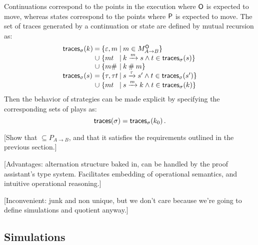 Continuations correspond to
the points in the execution where $ \mathsf{O} $ is expected to move,
whereas states correspond to
the points where $ \mathsf{P} $ is expected to move.
The set of traces generated by a continuation or state are
defined by mutual recursion as:
\[
  \begin{array}{l@{\:}c@{\:\{}l@{\:\mid\:}l}
    \kw{traces}_\sigma(k) & = & \varepsilon, m &
      m \in M_{A \rightarrow B}^\kw{O} \} \\
    & \cup & m t &
      k \xrightarrow{m} s \wedge t \in \kw{traces}_\sigma(s) \} \\
    & \cup & m \# &
      k \: \# \: m \} \\
    \kw{traces}_\sigma(s) & = & \tau, \tau t &
      s \xrightarrow{\tau} s' \wedge t \in \kw{traces}_\sigma(s') \} \\
    & \cup & m t &
      s \xrightarrow{m} k \wedge t \in \kw{traces}_\sigma(k) \}
  \end{array}
\]
Then the behavior of strategies can be made explicit
by specifying the corresponding sets of plays as:
\[
   \mathsf{traces} (\sigma) =  \mathsf{traces} _\sigma(k_0) \,.
\]

[Show that $\subseteq P_{A \rightarrow B}$,
and that it satisfies the requirements outlined
in the previous section.]

[Advantages: alternation structure baked in,
can be handled by the proof assistant's type system.
Facilitates embedding of operational semantics,
and intuitive operational reasoning.]

[Inconvenient: junk and non unique,
but we don't care because we're going to
define simulations and quotient anyway.]

\subsection{Simulations}

